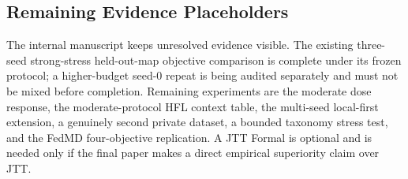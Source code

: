\subsection{Remaining Evidence Placeholders}

The internal manuscript keeps unresolved evidence visible. The existing three-seed strong-stress held-out-map objective comparison is complete under its frozen protocol; a higher-budget seed-0 repeat is being audited separately and must not be mixed before completion. Remaining experiments are the moderate dose response, the moderate-protocol HFL context table, the multi-seed local-first extension, a genuinely second private dataset, a bounded taxonomy stress test, and the FedMD four-objective replication. A JTT Formal is optional and is needed only if the final paper makes a direct empirical superiority claim over JTT.


